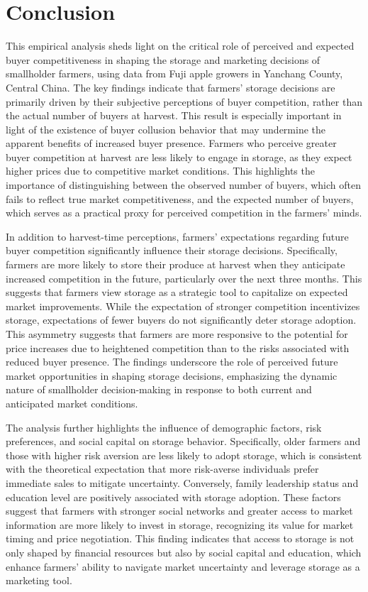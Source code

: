 \section{Conclusion}
\noindent This empirical analysis sheds light on the critical role of perceived and expected buyer competitiveness in shaping the storage and marketing decisions of smallholder farmers, using data from Fuji apple growers in Yanchang County, Central China. The key findings indicate that farmers' storage decisions are primarily driven by their subjective perceptions of buyer competition, rather than the actual number of buyers at harvest. This result is especially important in light of the existence of buyer collusion behavior that may undermine the apparent benefits of increased buyer presence. Farmers who perceive greater buyer competition at harvest are less likely to engage in storage, as they expect higher prices due to competitive market conditions. This highlights the importance of distinguishing between the observed number of buyers, which often fails to reflect true market competitiveness, and the expected number of buyers, which serves as a practical proxy for perceived competition in the farmers' minds.

In addition to harvest-time perceptions, farmers' expectations regarding future buyer competition significantly influence their storage decisions. Specifically, farmers are more likely to store their produce at harvest when they anticipate increased competition in the future, particularly over the next three months. This suggests that farmers view storage as a strategic tool to capitalize on expected market improvements. While the expectation of stronger competition incentivizes storage, expectations of fewer buyers do not significantly deter storage adoption. This asymmetry suggests that farmers are more responsive to the potential for price increases due to heightened competition than to the risks associated with reduced buyer presence. The findings underscore the role of perceived future market opportunities in shaping storage decisions, emphasizing the dynamic nature of smallholder decision-making in response to both current and anticipated market conditions.

The analysis further highlights the influence of demographic factors, risk preferences, and social capital on storage behavior. Specifically, older farmers and those with higher risk aversion are less likely to adopt storage, which is consistent with the theoretical expectation that more risk-averse individuals prefer immediate sales to mitigate uncertainty. Conversely, family leadership status and education level are positively associated with storage adoption. These factors suggest that farmers with stronger social networks and greater access to market information are more likely to invest in storage, recognizing its value for market timing and price negotiation. This finding indicates that access to storage is not only shaped by financial resources but also by social capital and education, which enhance farmers' ability to navigate market uncertainty and leverage storage as a marketing tool.

